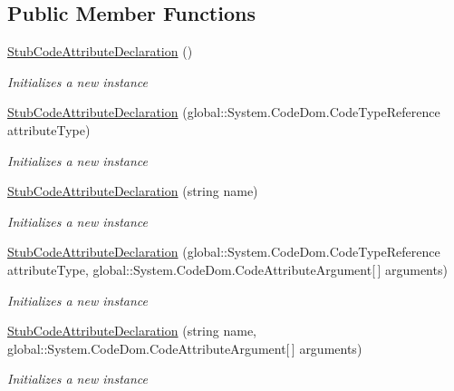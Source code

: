 \subsection*{Public Member Functions}
\begin{DoxyCompactItemize}
\item 
\hyperlink{class_system_1_1_code_dom_1_1_fakes_1_1_stub_code_attribute_declaration_a6ad3e3129bc2614b5d86c3924a26e4c2}{Stub\-Code\-Attribute\-Declaration} ()
\begin{DoxyCompactList}\small\item\em Initializes a new instance\end{DoxyCompactList}\item 
\hyperlink{class_system_1_1_code_dom_1_1_fakes_1_1_stub_code_attribute_declaration_aba60e5a9596330de3110b1724601eaff}{Stub\-Code\-Attribute\-Declaration} (global\-::\-System.\-Code\-Dom.\-Code\-Type\-Reference attribute\-Type)
\begin{DoxyCompactList}\small\item\em Initializes a new instance\end{DoxyCompactList}\item 
\hyperlink{class_system_1_1_code_dom_1_1_fakes_1_1_stub_code_attribute_declaration_af4dfc6f90a07acf6d56eb7d6be91068e}{Stub\-Code\-Attribute\-Declaration} (string name)
\begin{DoxyCompactList}\small\item\em Initializes a new instance\end{DoxyCompactList}\item 
\hyperlink{class_system_1_1_code_dom_1_1_fakes_1_1_stub_code_attribute_declaration_accd5a4c08f275e0bba03c46da860fddc}{Stub\-Code\-Attribute\-Declaration} (global\-::\-System.\-Code\-Dom.\-Code\-Type\-Reference attribute\-Type, global\-::\-System.\-Code\-Dom.\-Code\-Attribute\-Argument\mbox{[}$\,$\mbox{]} arguments)
\begin{DoxyCompactList}\small\item\em Initializes a new instance\end{DoxyCompactList}\item 
\hyperlink{class_system_1_1_code_dom_1_1_fakes_1_1_stub_code_attribute_declaration_a8727df97c336ab28ec03b311dba8c8dc}{Stub\-Code\-Attribute\-Declaration} (string name, global\-::\-System.\-Code\-Dom.\-Code\-Attribute\-Argument\mbox{[}$\,$\mbox{]} arguments)
\begin{DoxyCompactList}\small\item\em Initializes a new instance\end{DoxyCompactList}\end{DoxyCompactItemize}
